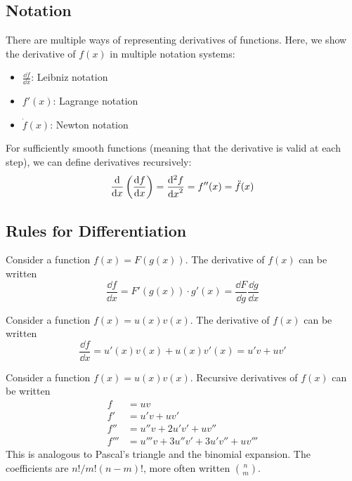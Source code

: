 \subsection{Notation}
There are multiple ways of representing derivatives of functions.
Here, we show the derivative of \(f(x)\) in multiple notation systems:
\begin{itemize}
	\item \(\displaystyle \frac{\dd{f}}{\dd{x}}\): Leibniz notation
	\item \(f'(x)\): Lagrange notation
	\item \(\dot f (x)\): Newton notation
\end{itemize}

For sufficiently smooth functions (meaning that the derivative is valid at each step), we can define derivatives recursively:
\[
	\frac{\mathrm{d}}{\dd{x}}\left( \frac{\dd{f}}{\dd{x}} \right)
	= \frac{\mathrm{d}^2f}{\dd{x}^2}
	= f''(x) = \ddot f (x)
\]

\subsection{Rules for Differentiation}
\begin{definition}
	Consider a function \(f(x) = F(g(x))\).
	The derivative of \(f(x)\) can be written
	\begin{equation}
		\frac{\dd{f}}{\dd{x}} = F'(g(x)) \cdot g'(x) = \frac{\dd{F}}{\dd{g}} \frac{\dd{g}}{\dd{x}}
	\end{equation}
\end{definition}

\begin{definition}
	Consider a function \(f(x) = u(x)v(x)\).
	The derivative of \(f(x)\) can be written
	\begin{equation}
		\frac{\dd{f}}{\dd{x}} = u'(x)v(x) + u(x)v'(x) = u'v + uv'
	\end{equation}
\end{definition}

\begin{definition}
	Consider a function \(f(x) = u(x)v(x)\).
	Recursive derivatives of \(f(x)\) can be written
	\begin{align}
		f    & = uv                                        \\
		f'   & = u'v + uv' \nonumber                       \\
		f''  & = u''v + 2u'v' + uv'' \nonumber             \\
		f''' & = u'''v + 3u''v' + 3u'v'' + uv''' \nonumber
	\end{align}
	This is analogous to Pascal's triangle and the binomial expansion.
	The coefficients are \(n!/m!(n-m)!
	\), more often written \(n \choose m\).
\end{definition}

